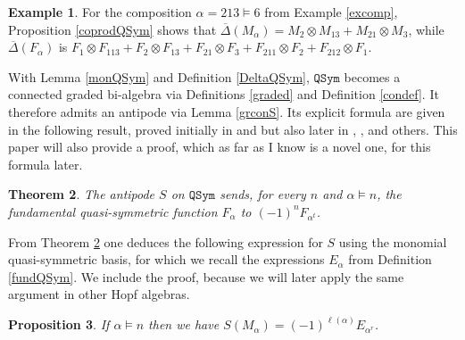 \documentclass{article}
\newtheorem{thm}{Theorem}[section]
\newtheorem{prop}[thm]{Proposition}
\theoremstyle{definition}
\newtheorem{ex}[thm]{Example}
\begin{document}
\begin{ex}
For the composition $\alpha=213\vDash6$ from Example \ref{excomp}, Proposition \ref{coprodQSym} shows that $\overline{\Delta}(M_{\alpha})=M_{2} \otimes M_{13}+M_{21} \otimes M_{3}$, while $\overline{\Delta}(F_{\alpha})$ is $F_{1} \otimes F_{113}+F_{2} \otimes F_{13}+F_{21} \otimes F_{3}+F_{211} \otimes F_{2}+F_{212} \otimes F_{1}$. \label{DeltaQSymex}
\end{ex}

With Lemma \ref{monQSym} and Definition \ref{DeltaQSym}, $\mathtt{QSym}$ becomes a connected graded bi-algebra via Definitions \ref{graded} and Definition \ref{condef}. It therefore admits an antipode via Lemma \ref{grconS}. Its explicit formula are given in the following result, proved initially in \cite{[MR]} and \cite{[E]} but also later in \cite{[BS]}, \cite{[Gr]}, and others. This paper will also provide a proof, which as far as I know is a novel one, for this formula later.
\begin{thm}
The antipode $S$ on $\mathtt{QSym}$ sends, for every $n$ and $\alpha \vDash n$, the fundamental quasi-symmetric function $F_{\alpha}$ to $(-1)^{n}F_{\alpha^{t}}$. \label{SQSymF}
\end{thm}
From Theorem \ref{SQSymF} one deduces the following expression for $S$ using the monomial quasi-symmetric basis, for which we recall the expressions $E_{\alpha}$ from Definition \ref{fundQSym}. We include the proof, because we will later apply the same argument in other Hopf algebras.
\begin{prop}
If $\alpha \vDash n$ then we have $S(M_{\alpha})=(-1)^{\ell(\alpha)}E_{\alpha^{r}}$. \label{SQSymM}
\end{prop}
\end{document}

